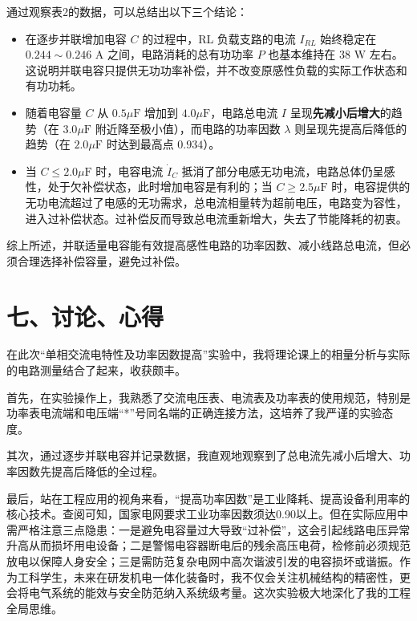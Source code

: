 ﻿\documentclass[10.5pt]{config}
\begin{document}
通过观察表2的数据，可以总结出以下三个结论：
\begin{itemize}[leftmargin=2em]
    \item 在逐步并联增加电容 $C$ 的过程中，RL 负载支路的电流 $I_{RL}$ 始终稳定在 $0.244 \sim 0.246\text{ A}$ 之间，电路消耗的总有功功率 $P$ 也基本维持在 $38\text{ W}$ 左右。这说明并联电容只提供无功功率补偿，并不改变原感性负载的实际工作状态和有功功耗。
    \item 随着电容量 $C$ 从 $0.5\mu\mathrm{F}$ 增加到 $4.0\mu\mathrm{F}$，电路总电流 $I$ 呈现\textbf{先减小后增大}的趋势（在 $3.0\mu\mathrm{F}$ 附近降至极小值），而电路的功率因数 $\lambda$ 则呈现先提高后降低的趋势（在 $2.0\mu\mathrm{F}$ 时达到最高点 $0.934$）。
    \item 当 $C \le 2.0\mu\mathrm{F}$ 时，电容电流 $\dot{I}_C$ 抵消了部分电感无功电流，电路总体仍呈感性，处于欠补偿状态，此时增加电容是有利的；当 $C \ge 2.5\mu\mathrm{F}$ 时，电容提供的无功电流超过了电感的无功需求，总电流相量转为超前电压，电路变为容性，进入过补偿状态。过补偿反而导致总电流重新增大，失去了节能降耗的初衷。
\end{itemize}
综上所述，并联适量电容能有效提高感性电路的功率因数、减小线路总电流，但必须合理选择补偿容量，避免过补偿。

\section*{七、讨论、心得}

在此次“单相交流电特性及功率因数提高”实验中，我将理论课上的相量分析与实际的电路测量结合了起来，收获颇丰。

首先，在实验操作上，我熟悉了交流电压表、电流表及功率表的使用规范，特别是功率表电流端和电压端“*”号同名端的正确连接方法，这培养了我严谨的实验态度。

其次，通过逐步并联电容并记录数据，我直观地观察到了总电流先减小后增大、功率因数先提高后降低的全过程。

最后，站在工程应用的视角来看，“提高功率因数”是工业降耗、提高设备利用率的核心技术。查阅可知，国家电网要求工业功率因数须达0.90以上。但在实际应用中需严格注意三点隐患：一是避免电容量过大导致“过补偿”，这会引起线路电压异常升高从而损坏用电设备；二是警惕电容器断电后的残余高压电荷，检修前必须规范放电以保障人身安全；三是需防范复杂电网中高次谐波引发的电容损坏或谐振。作为工科学生，未来在研发机电一体化装备时，我不仅会关注机械结构的精密性，更会将电气系统的能效与安全防范纳入系统级考量。这次实验极大地深化了我的工程全局思维。
\end{document}
